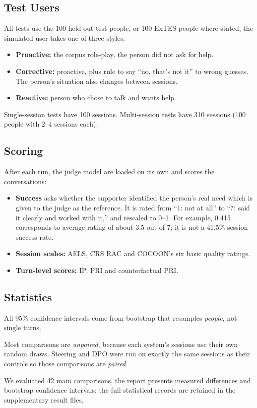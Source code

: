 \documentclass[journal]{IEEEtran}
\begin{document}
\subsection{Test Users}
All tests use the 100 held-out test people, or 100 ExTES people where stated, the simulated user takes one of three styles:
\begin{itemize}
\item \textbf{Proactive:} the corpus role-play, the person did not ask for help.
\item \textbf{Corrective:} proactive, plus rule to say ``no, that's not it'' to wrong guesses. The person's situation also changes between sessions.
\item \textbf{Reactive:} person who chose to talk and wants help.
\end{itemize}
Single-session tests have 100 sessions. Multi-session tests have 310 sessions (100 people with 2--4 sessions each).

\subsection{Scoring}
After each run, the judge model are loaded on its own and scores the conversations:
\begin{itemize}
\item \textbf{Success} asks whether the supporter identified the person's real need which is given to the judge as the reference. It is rated from ``1: not at all'' to ``7: said it clearly and worked with it,'' and rescaled to 0--1. For example, 0.415 corresponds to average rating of about 3.5 out of 7; it is not a 41.5\% session success rate.
\item \textbf{Session scales:} AELS, CRS RAC and COCOON's six basic quality ratings.
\item \textbf{Turn-level scores:} IP, PRI and counterfactual PRI.
\end{itemize}

\subsection{Statistics}
All 95\% confidence intervals come from bootstrap that resamples \emph{people}, not single turns.

Most comparisons are \emph{unpaired}, because each system's sessions use their own random draws. Steering and DPO were run on exactly the same sessions as their controls so those comparisons are \emph{paired}.

We evaluated 42 main comparisons, the report presents measured differences and bootstrap confidence intervals; the full statistical records are retained in the supplementary result files.
\end{document}
